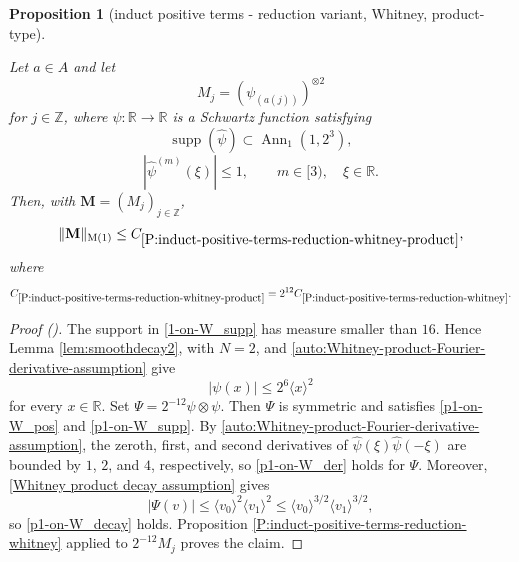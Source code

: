 \documentclass[12pt,reqno]{amsart}
\newcommand{\auto}{{({\tiny\faCar})}}
\theoremstyle{plain}
\newtheorem{proposition}[theorem]{Proposition}
\numberwithin{equation}{section}
\theoremstyle{remark}
\newcommand{\uses}[1]{}
\newcommand{\usesdefs}[1]{}
\newcommand{\leanok}{}
\newcommand{\lean}[1]{}
\newcommand{\Z}{{\mathbb Z}}
\newcommand{\R}{{\mathbb R}}
\newcommand{\M}{\mathbf{M}}
\begin{document}
\begin{proposition}[induct positive terms - reduction variant, Whitney, product-type]
\label{P:induct-positive-terms-reduction-whitney-product}\uses{P:induct-positive-terms-reduction-whitney,lem:smoothdecay2}\usesdefs{bracket bump,multiplicatively spaced monotone sequences,kernel sequences}
\lean{Auto.inductPositiveTermsReductionWhitneyProduct}
\leanok
Let $a\in A$ and let
\begin{equation}\label{auto:Whitney-product-kernel}
M_j=(\psi_{(a(j))})^{\otimes2}
\end{equation}
for $j\in\Z$, where $\psi:\R\to\R$ is a Schwartz function satisfying
\begin{equation}\label{1-on-W_supp}
\operatorname{supp}(\widehat\psi)\subset\operatorname{Ann}_1(1,2^3),
\end{equation}
\begin{equation}\label{auto:Whitney-product-Fourier-derivative-assumption}
|\widehat\psi^{(m)}(\xi)|\le1,
\qquad
m\in[3),
\quad
\xi\in\R.
\end{equation}
Then, with $\M=(M_j)_{j\in\Z}$,
\begin{equation}\label{auto:Whitney-product-reduction-bound}
\|\M\|_{{\rm M}(1)}\le C_{\ref{P:induct-positive-terms-reduction-whitney-product}},
\end{equation}
where
\begin{equation}\label{auto:Whitney-product-constant-definition}
C_{\ref{P:induct-positive-terms-reduction-whitney-product}}
=2^{12}C_{\ref{P:induct-positive-terms-reduction-whitney}}.
\end{equation}
\end{proposition}

\begin{proof}[Proof \auto]
The support in \eqref{1-on-W_supp} has measure smaller than $16$. Hence Lemma \ref{lem:smoothdecay2}, with $N=2$, and \eqref{auto:Whitney-product-Fourier-derivative-assumption} give
\begin{equation}\label{Whitney product decay assumption}
|\psi(x)|\le2^6\langle x\rangle^2
\end{equation}
for every $x\in\R$.
Set $\Psi=2^{-12}\psi\otimes\psi$. Then $\Psi$ is symmetric and satisfies \eqref{p1-on-W_pos} and \eqref{p1-on-W_supp}. By \eqref{auto:Whitney-product-Fourier-derivative-assumption}, the zeroth, first, and second derivatives of $\widehat\psi(\xi)\widehat\psi(-\xi)$ are bounded by $1$, $2$, and $4$, respectively, so \eqref{p1-on-W_der} holds for $\Psi$. Moreover, \eqref{Whitney product decay assumption} gives
\[
|\Psi(v)|
\le\langle v_0\rangle^2\langle v_1\rangle^2
\le\langle v_0\rangle^{3/2}\langle v_1\rangle^{3/2},
\]
so \eqref{p1-on-W_decay} holds. Proposition \ref{P:induct-positive-terms-reduction-whitney} applied to $2^{-12}M_j$ proves the claim.
\end{proof}
\end{document}
